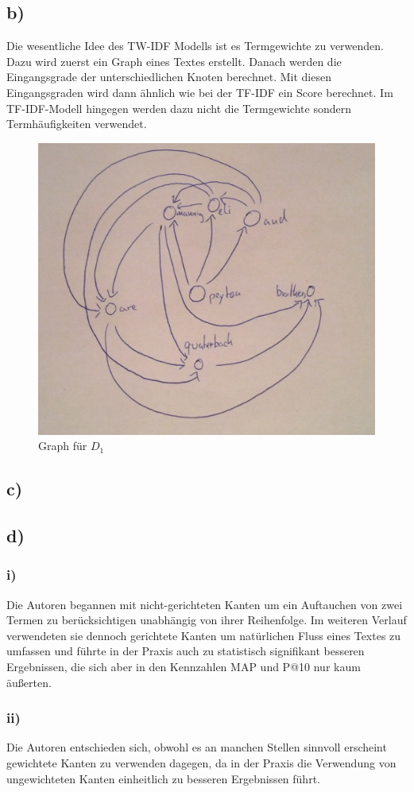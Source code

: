\subsection*{b)}
Die wesentliche Idee des TW-IDF Modells ist es Termgewichte zu verwenden. Dazu wird zuerst ein Graph eines Textes erstellt. Danach werden die Eingangsgrade der unterschiedlichen Knoten berechnet. Mit diesen Eingangsgraden wird dann ähnlich wie bei der TF-IDF ein Score berechnet. Im TF-IDF-Modell hingegen werden dazu nicht die Termgewichte sondern Termhäufigkeiten verwendet.
\begin{figure}[H]
\centering
\includegraphics[width=0.7\linewidth]{./Aufgabe3/Graph.jpg}
\caption{Graph für $D_{1}$}
\label{fig:Graph}
\end{figure}

\subsection*{c)}

\subsection*{d)}
\subsubsection*{i)}
Die Autoren begannen mit nicht-gerichteten Kanten um ein Auftauchen von zwei Termen zu berücksichtigen unabhängig von ihrer Reihenfolge. Im weiteren Verlauf verwendeten sie dennoch gerichtete Kanten um natürlichen Fluss eines Textes zu umfassen und führte in der Praxis auch zu statistisch signifikant besseren Ergebnissen, die sich aber in den Kennzahlen MAP und P@10 nur kaum äußerten.
\subsubsection*{ii)}
Die Autoren entschieden sich, obwohl es an manchen Stellen sinnvoll erscheint gewichtete Kanten zu verwenden dagegen, da in der Praxis die Verwendung von ungewichteten Kanten einheitlich zu besseren Ergebnissen führt.
